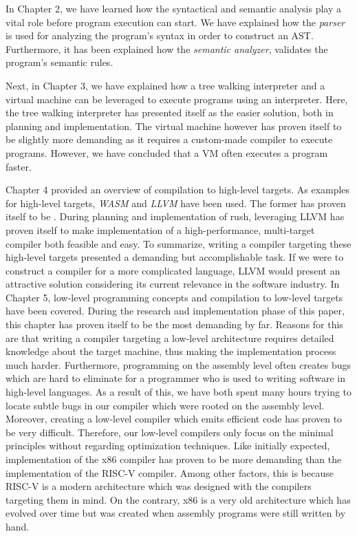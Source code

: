 In Chapter 2, we have learned how the syntactical and semantic analysis play a vital role before program execution can start.
We have explained how the \emph{parser} is used for analyzing the program's syntax in order to construct an AST.
Furthermore, it has been explained how the \emph{semantic analyzer}, validates the program's semantic rules.

Next, in Chapter 3, we have explained how a tree walking interpreter and a virtual machine can be leveraged to execute programs using an interpreter.
Here, the tree walking interpreter has presented itself as the easier solution, both in planning and implementation.
The virtual machine however has proven itself to be slightly more demanding as it requires a custom-made compiler to execute programs.
However, we have concluded that a VM often executes a program faster.

Chapter 4 provided an overview of compilation to high-level targets.
As examples for high-level targets, \emph{WASM} and \emph{LLVM} have been used.
The former has proven itself to be .
During planning and implementation of rush, leveraging LLVM has proven itself to make implementation of a high-performance, multi-target compiler both feasible and easy.
To summarize, writing a compiler targeting these high-level targets presented a demanding but accomplishable task.
If we were to construct a compiler for a more complicated language, LLVM would present an attractive solution considering its current relevance in the software industry.
In Chapter 5, low-level programming concepts and compilation to low-level targets have been covered.
During the research and implementation phase of this paper,
this chapter has proven itself to be the most demanding by far.
Reasons for this are that writing a compiler targeting a low-level architecture
requires detailed knowledge about the target machine, thus making the implementation process much harder.
Furthermore, programming on the assembly level often creates bugs which are hard to eliminate for a programmer who is used to writing software in high-level languages.
As a result of this, we have both spent many hours trying to locate subtle bugs in our compiler which were rooted on the assembly level.
Moreover, creating a low-level compiler which emits efficient code has proven to be very difficult.
Therefore, our low-level compilers only focus on the minimal principles without regarding optimization techniques.
Like initially expected, implementation of the x86 compiler has proven to be more demanding than the implementation of the RISC-V compiler.
Among other factors, this is because RISC-V is a modern architecture which was designed with the compilers targeting them in mind.
On the contrary, x86 is a very old architecture which has evolved over time but was created when assembly programs were still written by hand.

